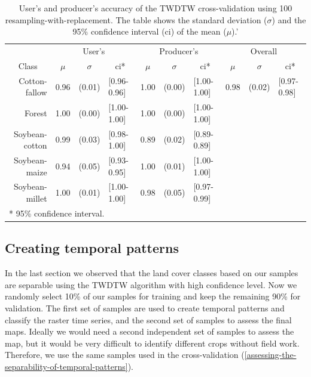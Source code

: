\documentclass[article,shortnames]{jss}
\begin{document}
\begin{table}[!ht]
\centering
\begin{tabular}{rlllllllll}
  \hline
   & \multicolumn{3}{c}{User's} & \multicolumn{3}{c}{Producer's} & \multicolumn{3}{c}{Overall}\\
\multicolumn{1}{c}{Class} & \multicolumn{1}{c}{$\mu$} & \multicolumn{1}{c}{$\sigma$} & \multicolumn{1}{c}{ci*} & \multicolumn{1}{c}{$\mu$} & \multicolumn{1}{c}{$\sigma$} & \multicolumn{1}{c}{ci*} & \multicolumn{1}{c}{$\mu$} & \multicolumn{1}{c}{$\sigma$} & \multicolumn{1}{c}{ci*}\\
 \hline
Cotton-fallow & 0.96 & (0.01) & [0.96-0.96] & 1.00 & (0.00) & [1.00-1.00] & 0.98 & (0.02) & [0.97-0.98] \\ 
  Forest & 1.00 & (0.00) & [1.00-1.00] & 1.00 & (0.00) & [1.00-1.00] &  &  &  \\ 
  Soybean-cotton & 0.99 & (0.03) & [0.98-1.00] & 0.89 & (0.02) & [0.89-0.89] &  &  &  \\ 
  Soybean-maize & 0.94 & (0.05) & [0.93-0.95] & 1.00 & (0.01) & [1.00-1.00] &  &  &  \\ 
  Soybean-millet & 1.00 & (0.01) & [1.00-1.00] & 0.98 & (0.05) & [0.97-0.99] &  &  &  \\ 
   \hline 
\multicolumn{10}{l}{* 95\% confidence interval.}
\end{tabular}
\caption{\label{tab:cross-validation} User's and producer's accuracy of the TWDTW cross-validation using 100 resampling-with-replacement. The table shows the standard deviation ($\sigma$) and the 95\% confidence interval (ci) of the mean ($\mu$).'} 
\end{table}

\subsection{Creating temporal
patterns}\label{creating-temporal-patterns}

In the last section we observed that the land cover classes based on our
samples are separable using the TWDTW algorithm with high confidence
level. Now we randomly select 10\% of our samples for training and keep
the remaining 90\% for validation. The first set of samples are used to
create temporal patterns and classify the raster time series, and the
second set of samples to assess the final maps. Ideally we would need a
second independent set of samples to assess the map, but it would be
very difficult to identify different crops without field work.
Therefore, we use the same samples used in the cross-validation
(\autoref{assessing-the-separability-of-temporal-patterns}).
\end{document}
